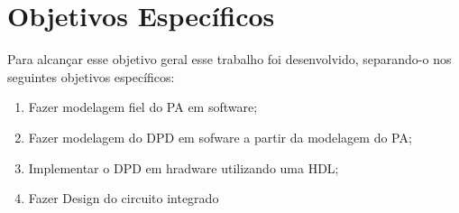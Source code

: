 \section{Objetivos Específicos}
Para alcançar esse objetivo geral esse trabalho foi desenvolvido, separando-o nos seguintes objetivos específicos:

\begin{enumerate}
    \item Fazer modelagem fiel do PA em software;
    \item Fazer modelagem do DPD em sofware a partir da modelagem do PA;
    \item Implementar o DPD em hradware utilizando uma HDL;
    \item Fazer Design do circuito integrado
\end{enumerate}
